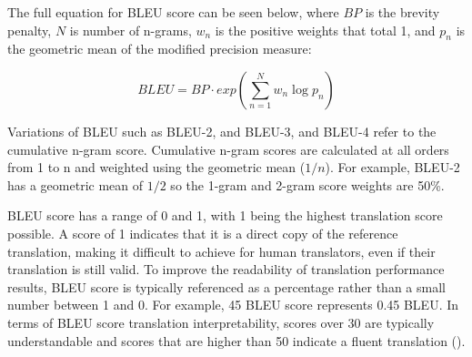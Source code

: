 The full equation for BLEU score can be seen below, where $BP$ is the brevity penalty, $N$ is number of n-grams, $w_n$ is the  positive weights that total 1, and $p_n$ is the geometric mean of the modified precision measure:

\begin{equation}
    BLEU = BP \cdot exp\left (  \sum_{n=1}^{N} w_{n} \log  p_{n}\right )
\end{equation}


Variations of BLEU such as \acrshort{BLEU}-2, and \acrshort{BLEU}-3, and \acrshort{BLEU}-4 refer to the cumulative n-gram score. Cumulative n-gram scores are calculated at all orders from 1 to n and weighted using the geometric mean ($1/n$). For example, \acrshort{BLEU}-2 has a geometric mean of $1/2$ so the 1-gram and 2-gram score weights are 50\%.















\acrshort{BLEU} score has a range of 0 and 1, with 1 being the highest translation score possible. A score of 1 indicates that it is a direct copy of the reference translation, making it difficult to achieve for human translators, even if their translation is still valid. To improve the readability of translation performance results, \acrshort{BLEU} score is typically referenced as a percentage rather than a small number between 1 and 0. For example, 45 \acrshort{BLEU} score represents 0.45 \acrshort{BLEU}. In terms of \acrshort{BLEU} score translation interpretability, scores over 30 are typically understandable and scores that are higher than 50 indicate a fluent translation (\cite{lavie_evaluating_2010}).

